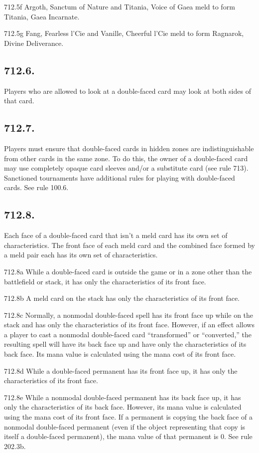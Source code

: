 712.5f Argoth, Sanctum of Nature and Titania, Voice of Gaea meld to form Titania, Gaea Incarnate.

712.5g Fang, Fearless l’Cie and Vanille, Cheerful l’Cie meld to form Ragnarok, Divine Deliverance.

\subsection*{712.6.}
Players who are allowed to look at a double-faced card may look at both sides of that card.

\subsection*{712.7.}
Players must ensure that double-faced cards in hidden zones are indistinguishable from other cards in the same zone. To do this, the owner of a double-faced card may use completely opaque card sleeves and/or a substitute card (see rule 713). Sanctioned tournaments have additional rules for playing with double-faced cards. See rule 100.6.

\subsection*{712.8.}
Each face of a double-faced card that isn’t a meld card has its own set of characteristics. The front face of each meld card and the combined face formed by a meld pair each has its own set of characteristics.

712.8a While a double-faced card is outside the game or in a zone other than the battlefield or stack, it has only the characteristics of its front face.

712.8b A meld card on the stack has only the characteristics of its front face.

712.8c Normally, a nonmodal double-faced spell has its front face up while on the stack and has only the characteristics of its front face. However, if an effect allows a player to cast a nonmodal double-faced card “transformed” or “converted,” the resulting spell will have its back face up and have only the characteristics of its back face. Its mana value is calculated using the mana cost of its front face.

712.8d While a double-faced permanent has its front face up, it has only the characteristics of its front face.

712.8e While a nonmodal double-faced permanent has its back face up, it has only the characteristics of its back face. However, its mana value is calculated using the mana cost of its front face. If a permanent is copying the back face of a nonmodal double-faced permanent (even if the object representing that copy is itself a double-faced permanent), the mana value of that permanent is 0. See rule 202.3b.

